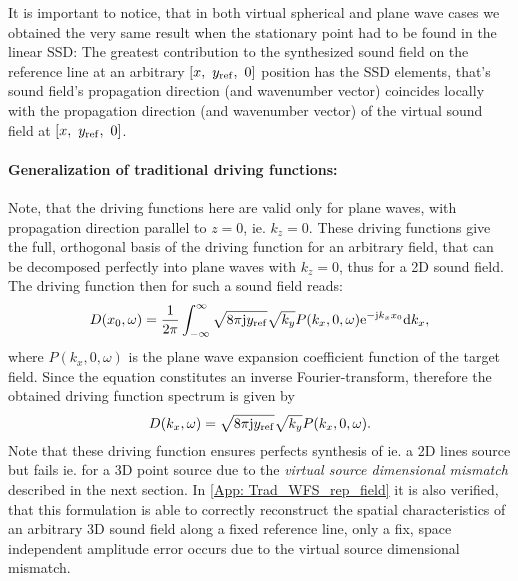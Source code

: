 \vspace{3mm}
It is important to notice, that in both virtual spherical and plane wave cases we obtained the very same result when the stationary point had to be found in the linear SSD:
The greatest contribution to the synthesized sound field on the reference line  at an arbitrary $[x,\ \yref,\ 0]$ position has the SSD elements, that's sound field's propagation  direction (and wavenumber vector) coincides locally with the propagation direction (and wavenumber vector) of the virtual sound field at $[x,\ \yref,\ 0]$. %

\paragraph{Generalization of traditional driving functions:\\}
Note, that the driving functions here are valid only for plane waves, with propagation direction parallel to $z=0$, ie. $k_z=0$. These driving functions give the full, orthogonal basis of the driving function for an arbitrary field, that can be decomposed perfectly into plane waves with $k_z=0$, thus for a 2D sound field. The driving function then for such a sound field reads:
\begin{equation}
D(x_0,\omega) = \frac{1}{2\pi} \int_{-\infty}^{\infty} \sqrt{8\pi \mathrm{j} y_{\mathrm{ref}}}  \sqrt{k_y} P(k_x,0,\omega) \mathrm{e}^{-\mathrm{j}  k_x x_0} \mathrm{d} k_x, 
\end{equation} 
where $P(k_x,0,\omega)$ is the plane wave expansion coefficient function of the target field.
Since the equation constitutes an inverse Fourier-transform, therefore the obtained driving function spectrum is given by
\begin{equation}
D(k_x,\omega) = \sqrt{8\pi \mathrm{j} y_{\mathrm{ref}} } \sqrt{k_y} P(k_x,0,\omega).
\label{Eq:Theory:Trad_WFS_general}
\end{equation}
Note that these driving function ensures perfects synthesis of ie. a 2D lines source but fails ie. for a 3D point source due to the \emph{virtual source dimensional mismatch} described in the next section. In \ref{App: Trad_WFS_rep_field} it is also verified, that this formulation is able to correctly reconstruct the spatial characteristics of an arbitrary 3D sound field along a fixed reference line, only a fix, space independent amplitude error occurs due to the virtual source dimensional mismatch.

